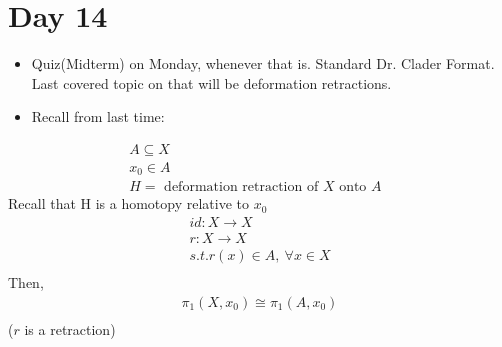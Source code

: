 \section{Day 14}
    \begin{itemize}
        \item Quiz(Midterm) on Monday, whenever that is. Standard Dr. Clader Format. Last
            covered topic on that will be deformation retractions.
        \item Recall from last time:
    \end{itemize}
    \begin{theorem}
        \begin{align*}
            A\subseteq X\\
            x_0 \in A\\
            H=\text{ deformation retraction of $X$ onto $A$ }
        \end{align*}
        Recall that H is a homotopy relative to $x_0$
        \begin{align*}
            id: X\rightarrow X\\
            r: X \rightarrow X\\
            s.t. r(x)\in A,\ \forall x\in X\\
        \end{align*}
        Then,
        \begin{align*}
            \pi_1(X,x_0)\cong\pi_1(A,x_0)\\
        \end{align*}
        ($r$ is a retraction)
    \end{theorem}
